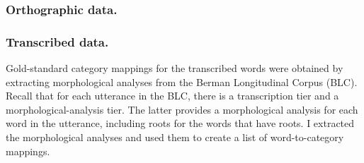 \subsubsection{Orthographic data.}

%
%

\subsubsection{Transcribed data.} Gold-standard category mappings for the 
transcribed words were obtained by extracting morphological analyses from the Berman 
Longitudinal Corpus (BLC). Recall that for each utterance in the BLC, 
there is a transcription tier and a morphological-analysis tier. The latter provides a 
morphological analysis for each word in the utterance, including roots for the words 
that have roots. I extracted the morphological analyses and used them to create a list of 
word-to-category mappings. %
